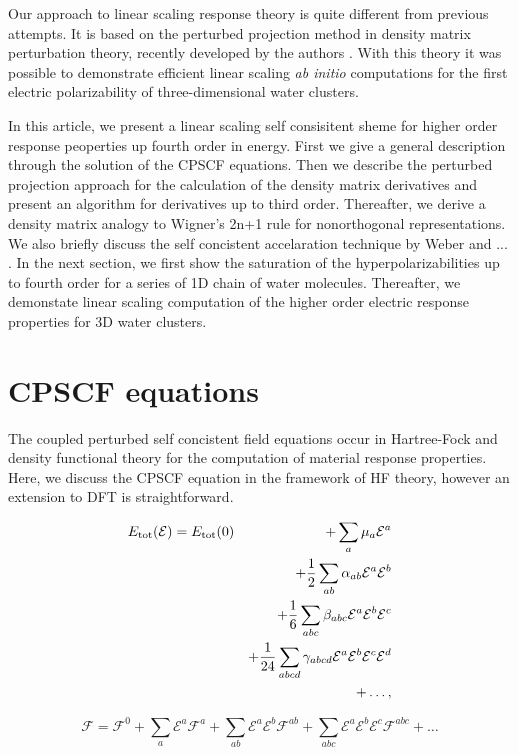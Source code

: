\documentclass[prl,aps,twocolumn,showpacs,twocolumngrid,superbib]{revtex4}
\begin{document}
 Our approach to linear scaling response theory is quite different 
 from previous attempts. It is based on the perturbed projection
 method in density matrix perturbation theory, recently developed
 by the authors \cite{Niklasson04,Weber04}. With this theory it
 was possible to demonstrate efficient linear scaling {\em ab initio}
 computations for the first electric polarizability of three-dimensional 
 water clusters.

 In this article, we present a linear scaling self consisitent sheme
 for higher order response peoperties up fourth order in energy.
 First we give a general description through the solution of the CPSCF equations.
 Then we describe the perturbed projection approach for the calculation
 of the density matrix derivatives and present
 an algorithm for derivatives up to third order.
 Thereafter, we derive a density matrix analogy to Wigner's 2n+1
 rule for nonorthogonal representations. We also briefly discuss the
 self concistent accelaration technique by Weber and ... . In the next section,
 we first show the saturation of the hyperpolarizabilities up to fourth order
 for a series of 1D chain of water molecules. Thereafter, we demonstate
 linear scaling computation of the higher order electric response properties
 for 3D water clusters.



\section{CPSCF equations}
The coupled perturbed self concistent field equations occur in Hartree-Fock
and density functional theory for the computation of material response
properties. Here, we discuss the CPSCF equation in the framework of
HF theory, however an extension to DFT is straightforward.


\begin{eqnarray}
  E_{\rm tot}(\mathcal{E})= E_{\rm tot}(0) && +\sum_a\mu_a\mathcal{E}^a\\
  &&+\frac{1}{2}\sum_{ab}\alpha_{ab}\mathcal{E}^a\mathcal{E}^b\\
  &&+\frac{1}{6}\sum_{abc}\beta_{abc}\mathcal{E}^a\mathcal{E}^b\mathcal{E}^c\\
  &&+\frac{1}{24}\sum_{abcd}\gamma_{abcd}\mathcal{E}^a\mathcal{E}^b\mathcal{E}^c\mathcal{E}^d\\
  &&+\dots,
\end{eqnarray}



\begin{equation}
  \mathcal{F}=\mathcal{F}^{0}+\sum_a \mathcal{E}^{a}\mathcal{F}^{a}+
  \sum_{ab} \mathcal{E}^{a}\mathcal{E}^{b}\mathcal{F}^{ab}+
  \sum_{abc} \mathcal{E}^{a}\mathcal{E}^{b}\mathcal{E}^{c}\mathcal{F}^{abc}+\dots
\end{equation}
\end{document}
